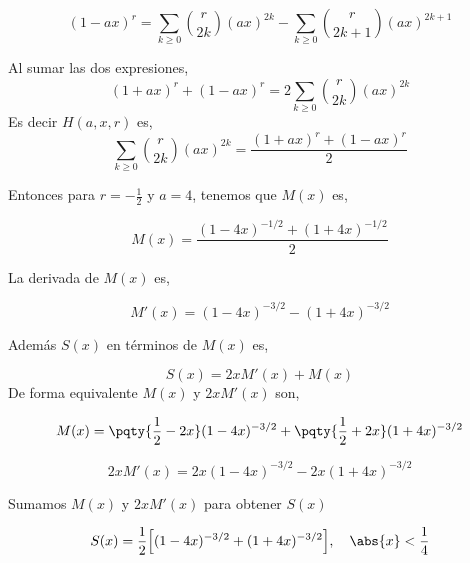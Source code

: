 {	 \[
	 (1-ax)^r 
	 =\sum_{k\ge0}\binom{r}{2k}(ax)^{2k}-\sum_{k\ge0}\binom{r}{2k+1}(ax)^{2k+1}
	 \]
	 
	 Al sumar las dos expresiones,
	 \[
	 (1+ax)^r+(1-ax)^r=2\sum_{k\ge0}\binom{r}{2k}(ax)^{2k}
	 \]
	 Es decir $ H(a,x,r)$ es,
	 \[
	 \sum_{k\ge0}\binom{r}{2k}(ax)^{2k}=\frac{(1+ax)^r+(1-ax)^r}{2}
	 \]
	 
	 
	 Entonces para $r=-\frac{1}{2}$ y $a=4$, tenemos que $M(x)$ es,
	 
	 \newpage
	 
	 $$
	 M(x)=\frac{ (1-4x)^{-1/2}+(1+4x)^{-1/2}}{2} 
	 $$
	 
	 La derivada de $M(x)$ es,  
	 
	 $$
	 M'(x)=(1-4x)^{-3/2}-(1+4x)^{-3/2}
	 $$
	 
	 Además $S(x)$ en términos de $M(x)$ es,
	 
	 $$
	 S(x)=2x  M'(x) +M(x)
	 $$ 
	 De forma equivalente $M(x)$ y $2xM'(x)$ son,
	 
	 $$
	 M(x)=   \pqty{\frac{1}{2}-2x}(1-4x)^{-3/2}+\pqty{\frac{1}{2}+2x}(1+4x)^{-3/2} 
	 $$
	 
	 $$
	 2xM'(x)=  2x(1-4x)^{-3/2}-2x(1+4x)^{-3/2}
	 $$
	 
	 Sumamos $M(x)$ y $2xM'(x)$ para obtener $S(x)$
	 
	
}
\begin{LnxRptaBox} 
	 $$
	S(x)=\frac{1}{2}\Bigl[(1-4x)^{-3/2}+(1+4x)^{-3/2}\Bigr],\quad  \abs{x}<\frac{1}{4}
	$$
\end{LnxRptaBox} 

 